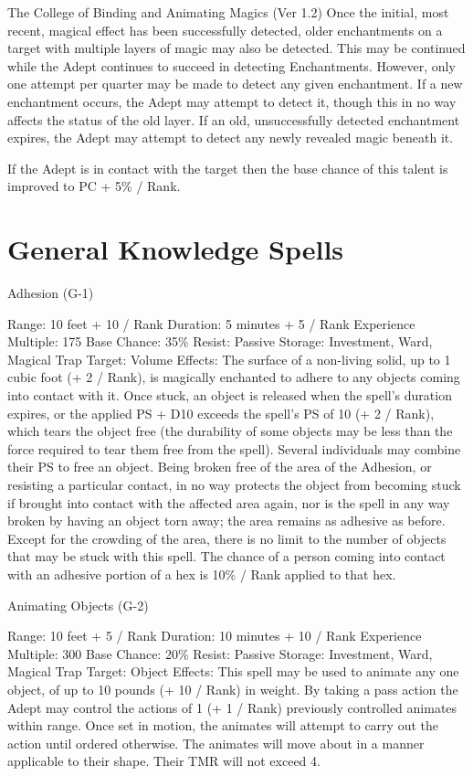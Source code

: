 \begin{Chapter}{The College of Binding and Animating Magics (Ver 1.2)}
Once  the  initial,  most  recent,  magical  effect  has 
been  successfully  detected,  older  enchantments  on 
a target with multiple layers of magic may also be 
detected.  This  may  be  continued  while  the  Adept 
continues  to  succeed  in  detecting  Enchantments. 
However,  only  one  attempt  per  quarter  may  be 
made  to  detect  any  given  enchantment.  If  a  new 
enchantment  occurs,  the  Adept  may  attempt  to 
detect it, though this in no way affects the status of 
the  old  layer.  If  an  old,  unsuccessfully  detected 
enchantment  expires,  the  Adept  may  attempt  to 
detect any newly revealed magic beneath it. 

If  the  Adept  is  in  contact  with  the  target  then  the 
base chance of this talent is improved to PC + 5\% / 
Rank. 

\section{General Knowledge Spells}

Adhesion (G-1) 

Range: 10 feet + 10 / Rank 
Duration: 5 minutes + 5 / Rank 
Experience Multiple: 175 
Base Chance: 35\% 
Resist: Passive 
Storage: Investment, Ward, Magical Trap 
Target: Volume 
Effects:  The  surface  of  a  non-living  solid,  up  to  1 
cubic  foot  (+ 2  / Rank),  is  magically  enchanted to 
adhere  to  any  objects  coming  into  contact  with  it. 
Once  stuck,  an  object  is  released  when  the  spell’s 
duration expires, or the applied PS + D10 exceeds 
the  spell’s  PS  of  10  (+  2  /  Rank),  which  tears  the 
object  free  (the  durability  of  some  objects  may  be 
less than  the  force  required to  tear  them  free  from 
the  spell).  Several  individuals  may  combine  their 
PS to free an object. Being broken free of the area 
of the Adhesion, or resisting a particular contact, in 
no way protects the object from becoming stuck if 
brought  into  contact  with  the  affected  area  again, 
nor  is  the  spell  in  any  way  broken  by  having  an 
object  torn  away;  the  area  remains  as  adhesive  as 
before. Except for the crowding of the area, there is 
no limit to the number of objects that may be stuck 
with this spell. The chance of a person coming into 
contact with an adhesive portion of a hex is 10\% / 
Rank applied to that hex. 

Animating Objects (G-2) 

Range: 10 feet + 5 / Rank 
Duration: 10 minutes + 10 / Rank 
Experience Multiple: 300 
Base Chance: 20\% 
Resist: Passive 
Storage: Investment, Ward, Magical Trap 
Target: Object 
Effects: This spell may be used to animate any one 
object, of up to 10 pounds (+ 10 / Rank) in weight. 
By taking a pass action the Adept may control the 
actions  of  1  (+  1  /  Rank)  previously  controlled 
animates  within  range.  Once  set  in  motion,  the 
animates  will  attempt  to  carry  out  the  action  until 
ordered  otherwise.  The  animates  will  move  about 
in  a  manner  applicable  to  their  shape.  Their  TMR 
will not exceed 4. 


\end{Chapter}
